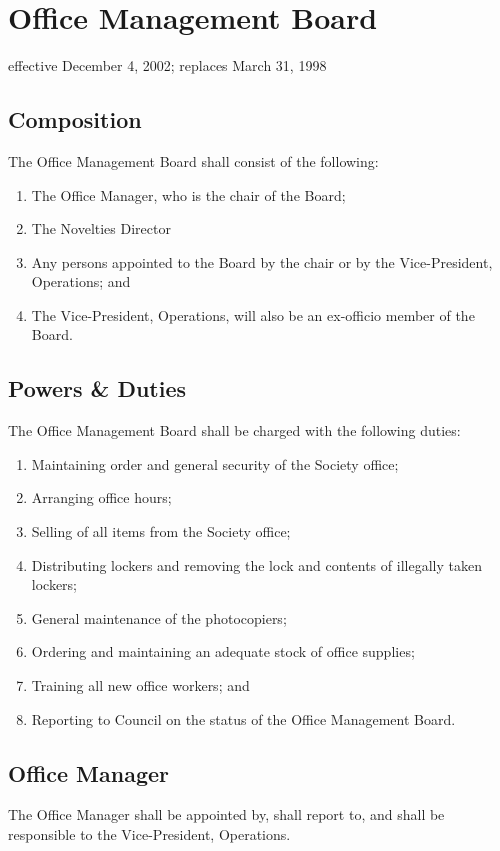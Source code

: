 \section{Office Management Board}
effective December 4, 2002; replaces March 31, 1998

\subsection{Composition}
The Office Management Board shall consist of the following:
\begin{enumerate}
\item The Office Manager, who is the chair of the Board;
\item The Novelties Director
\item Any persons appointed to the Board by the chair or by the Vice-President, Operations; and
\item The Vice-President, Operations, will also be an ex-officio member of the Board.
\end{enumerate}

\subsection{Powers \& Duties}
The Office Management Board shall be charged with the following duties:
\begin{enumerate}
\item Maintaining order and general security of the Society office;
\item Arranging office hours;
\item Selling of all items from the Society office;
\item Distributing lockers and removing the lock and contents of illegally taken lockers;
\item General maintenance of the photocopiers;
\item Ordering and maintaining an adequate stock of office supplies;
\item Training all new office workers; and
\item Reporting to Council on the status of the Office Management Board.
\end{enumerate}

\subsection{Office Manager}
The Office Manager shall be appointed by, shall report to, and shall be responsible to the Vice-President, Operations.